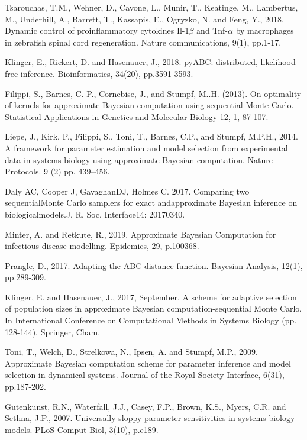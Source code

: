 \documentclass[12pt,a4paper]{report}
\begin{document}
\begin{thebibliography}{100}

 Tsarouchas, T.M., Wehner, D., Cavone, L., Munir, T., Keatinge, M., Lambertus, M., Underhill, A., Barrett, T., Kassapis, E., Ogryzko, N. and Feng, Y., 2018. Dynamic control of proinflammatory cytokines Il-1$\beta$ and Tnf-$\alpha$ by macrophages in zebrafish spinal cord regeneration. Nature communications, 9(1), pp.1-17.

 Klinger, E., Rickert, D. and Hasenauer, J., 2018. pyABC: distributed, likelihood-free inference. Bioinformatics, 34(20), pp.3591-3593.

 Filippi, S., Barnes, C. P., Cornebise, J., and Stumpf, M..H. (2013). On optimality of kernels for approximate Bayesian computation using sequential Monte Carlo. Statistical Applications in Genetics and Molecular Biology 12, 1, 87-107.

 Liepe, J., Kirk, P., Filippi, S., Toni, T., Barnes, C.P., and Stumpf, M.P.H., 2014. A framework for parameter estimation and model selection from experimental data in systems biology using approximate Bayesian computation. Nature Protocols. 9 (2) pp. 439–456. 

 Daly AC, Cooper J, GavaghanDJ, Holmes C. 2017. Comparing two sequentialMonte Carlo samplers for exact andapproximate Bayesian inference on biologicalmodels.J. R. Soc. Interface14: 20170340.

 Minter, A. and Retkute, R., 2019. Approximate Bayesian Computation for infectious disease modelling. Epidemics, 29, p.100368.

 Prangle, D., 2017. Adapting the ABC distance function. Bayesian Analysis, 12(1), pp.289-309.

 Klinger, E. and Hasenauer, J., 2017, September. A scheme for adaptive selection of population sizes in approximate Bayesian computation-sequential Monte Carlo. In International Conference on Computational Methods in Systems Biology (pp. 128-144). Springer, Cham.

 Toni, T., Welch, D., Strelkowa, N., Ipsen, A. and Stumpf, M.P., 2009. Approximate Bayesian computation scheme for parameter inference and model selection in dynamical systems. Journal of the Royal Society Interface, 6(31), pp.187-202.

 Gutenkunst, R.N., Waterfall, J.J., Casey, F.P., Brown, K.S., Myers, C.R. and Sethna, J.P., 2007. Universally sloppy parameter sensitivities in systems biology models. PLoS Comput Biol, 3(10), p.e189.

\end{thebibliography}
\end{document}
